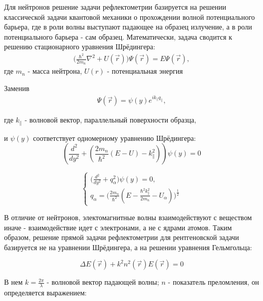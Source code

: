 \documentclass[a4paper]{article}
\begin{document}
Для нейтронов решение задачи рефлектометрии базируется на решении классической задачи квантовой механики о прохождении волной потенциального барьера, где в роли волны выступают падающее на образец излучение, а в роли потенциального барьера  - сам образец. Математически, задача сводится к решению стационарного уравнения Шрёдингера:
\begin{align}
    \Bigg(\frac{\hbar^2}{2m_n}\nabla^2 + U(\vec{r})\Bigg)\Psi(\vec{r}) = E\Psi(\vec{r}),
\end{align}
где $m_n$ - масса нейтрона, $U(r)$ - потенциальная энергия

Заменив \begin{align}
\Psi(\vec{r}) = \psi(y)e^{{i} k_{||} q_{||}},
\end{align}

где \( k_{\parallel} \) - волновой вектор, параллельный поверхности образца,

и \(\psi(y)\) соответствует одномерному уравнению Шрёдингера:
\begin{equation}
    \left( \frac{d^2}{dy^2} + \left( \frac{2m_n}{\hbar^2}(E - U) - k_{\parallel}^2 \right) \right) \psi(y) = 0
\end{equation}

 

\begin{equation}
    \begin{cases}

    \Bigg( \frac{d^2}{dy^2} + q_{\alpha}^2 \Bigg) \psi(y) = 0, \\

    q_{\alpha} = \Bigg(\frac{2m_n}{\hbar^2}(E - \frac{\hbar^2 k_{\parallel}^2}{2m_n} - U_{\alpha}) \Bigg)^\frac{1}{2}
\end{cases}
\label{Schrodinger_EQ}
\end{equation}   

В отличие от нейтронов, электомагнитные волны взаимодействуют с веществом иначе - взаимодействие идет с электронами, а не с ядрами атомов. Таким образом, решение прямой задачи рефлектометрии для рентгеновской задачи базируется не на уравнении Шрёдингера, а на решении уравнения Гельмгольца:

\begin{equation}
    \Delta E(\vec{r}) + k^2 n^2(\vec{r}) E(\vec{r}) = 0
    \label{helmholtz}
\end{equation}

В нем $k = \frac{2\pi}{\lambda}$ - волновой вектор падающей волны; $n$ - показатель преломления, он определяется выражением:
\end{document}
